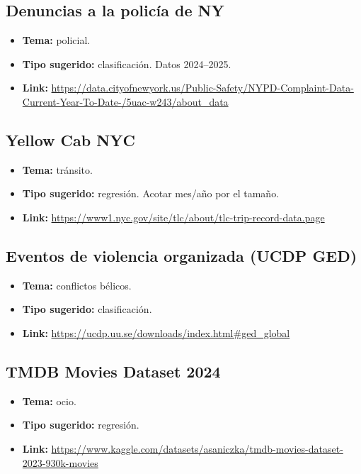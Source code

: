 \documentclass[12pt]{article}
\begin{document}
\subsection{Denuncias a la policía de NY}
\begin{itemize}
    \item \textbf{Tema:} policial.
    \item \textbf{Tipo sugerido:} clasificación. Datos 2024--2025.
    \item \textbf{Link:} \url{https://data.cityofnewyork.us/Public-Safety/NYPD-Complaint-Data-Current-Year-To-Date-/5uac-w243/about_data}
\end{itemize}

\subsection{Yellow Cab NYC}
\begin{itemize}
    \item \textbf{Tema:} tránsito.
    \item \textbf{Tipo sugerido:} regresión. Acotar mes/año por el tamaño.
    \item \textbf{Link:} \url{https://www1.nyc.gov/site/tlc/about/tlc-trip-record-data.page}
\end{itemize}

\subsection{Eventos de violencia organizada (UCDP GED)}
\begin{itemize}
    \item \textbf{Tema:} conflictos bélicos.
    \item \textbf{Tipo sugerido:} clasificación.
    \item \textbf{Link:} \url{https://ucdp.uu.se/downloads/index.html#ged_global}
\end{itemize}

\subsection{TMDB Movies Dataset 2024}
\begin{itemize}
    \item \textbf{Tema:} ocio.
    \item \textbf{Tipo sugerido:} regresión.
    \item \textbf{Link:} \url{https://www.kaggle.com/datasets/asaniczka/tmdb-movies-dataset-2023-930k-movies}
\end{itemize}
\end{document}
